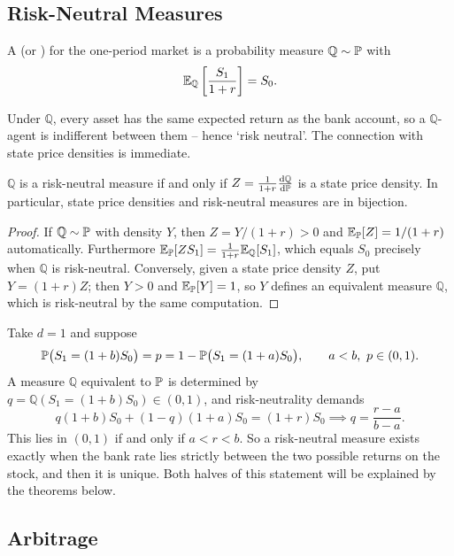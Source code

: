 \documentclass[a4paper]{scrartcl}
\newcommand{\QQ}{\mathbb{Q}}
\newcommand{\dP}{\mathrm{d}\PP}
\newcommand{\dQ}{\mathrm{d}\QQ}
\begin{document}
\subsection{Risk-Neutral Measures}

\begin{definition}
	A  (or ) for the one-period market is a probability measure $\QQ \sim \PP$ with
	$$
	\EE_\QQ\left[\frac{S_1}{1+r}\right] = S_0.
	$$
\end{definition}

Under $\QQ$, every asset has the same expected return as the bank account, so a $\QQ$-agent is indifferent between them -- hence `risk neutral'. The connection with state price densities is immediate.

\begin{proposition}
	$\QQ$ is a risk-neutral measure if and only if $Z = \frac{1}{1+r}\frac{\dQ}{\dP}$ is a state price density. In particular, state price densities and risk-neutral measures are in bijection.
\end{proposition}

\begin{proof}
	If $\QQ \sim \PP$ with density $Y$, then $Z = Y/(1+r) > 0$ and $\mathbb{E}_{\mathbb{P}}[Z] = 1/(1+r)$ automatically. Furthermore $\EE_\PP[ZS_1] = \frac{1}{1+r}\EE_\QQ[S_1]$, which equals $S_0$ precisely when $\QQ$ is risk-neutral. Conversely, given a state price density $Z$, put $Y = (1+r)Z$; then $Y > 0$ and $\mathbb{E}_{\mathbb{P}}[Y] = 1$, so $Y$ defines an equivalent measure $\QQ$, which is risk-neutral by the same computation.
\end{proof}

\begin{example}\label{ex:one-period-binom}
	Take $d = 1$ and suppose
	$$
	\mathbb{P}\big(S_1 = (1+b)S_0\big) = p = 1 - \mathbb{P}\big(S_1 = (1+a)S_0\big), \qquad a < b,\ p \in (0,1).
	$$
	A measure $\QQ$ equivalent to $\mathbb{P}$ is determined by $q = \QQ(S_1 = (1+b)S_0) \in (0,1)$, and risk-neutrality demands
	$$
	q(1+b)S_0 + (1-q)(1+a)S_0 = (1+r)S_0 \implies q = \frac{r-a}{b-a}.
	$$
	This lies in $(0,1)$ if and only if $a < r < b$. So a risk-neutral measure exists exactly when the bank rate lies strictly between the two possible returns on the stock, and then it is unique. Both halves of this statement will be explained by the theorems below.
\end{example}

\subsection{Arbitrage}
\end{document}
